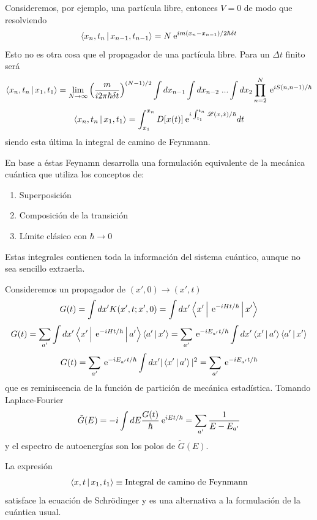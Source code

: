 \documentclass[10pt,oneside]{CBFT_book}
\begin{document}
Consideremos, por ejemplo, una partícula libre, entonces $V=0$ de modo que resolviendo 
\[
	\Braket{x_n,t_n|x_{n-1},t_{n-1}} = N \:\mathrm{e}^{im(x_n - x_{n-1})/2\hbar\delta t}
\]
Esto no es otra cosa que el propagador de una partícula libre. Para un $\Delta t$ finito será 
\[
	\Braket{x_n,t_n|x_1,t_1}  = \lim_{N\to\infty} \left(\frac{m}{i2\pi\hbar\delta t}\right)^{(N-1)/2}
	\int dx_{n-1}\int dx_{n-2} \; ... \int dx_2 \prod_{n=2}^N \:\mathrm{e}^{i S(n,n-1)/\hbar}
\]
\[
	\Braket{x_n,t_n|x_1,t_1}  = \int_{x_1}^{x_n} D[x(t)] \:\mathrm{e}^{i \int _{t_1}^{t_n} \mathscr{L}(x,\dot{x})/\hbar} dt
\]
siendo esta última la integral de camino de Feynmann.

En base a éstas Feynamn desarrolla una formulación equivalente de la mecánica cuántica que utiliza los 
conceptos de:
\begin{enumerate}
 \item Superposición
 \item Composición de la transición
 \item Límite clásico con $\hbar \to 0$
\end{enumerate}

Estas integrales contienen toda la información del sistema cuántico, aunque no sea sencillo extraerla.

Consideremos un propagador de $(x',0) \to (x',t)$
\[
	G(t) = \int dx' K(x',t ; x', 0) = \int dx' \Braket{x'|\:\mathrm{e}^{-i Ht/\hbar}|x'}
\]
\[
	G(t) = \sum_{a'} \int dx' \Braket{x'|\:\mathrm{e}^{-i Ht/\hbar}|a'}\Braket{a'|x'} =
		\sum_{a'} \:\mathrm{e}^{-i E_{a'}t/\hbar} \int dx' \Braket{x'|a'}\Braket{a'|x' }
\]
\[
	G(t) = \sum_{a'} \:\mathrm{e}^{-i E_{a'}t/\hbar} \int dx' |\Braket{x'|a'}|^2 = \sum_{a'} \:\mathrm{e}^{-i E_{a'}t/\hbar} 
\]
que es reminiscencia de la función de partición de mecánica estadística. Tomando Laplace-Fourier 
\[
	\tilde{G}(E) = -i \int dE \frac{G(t)}{\hbar} \:\mathrm{e}^{i E t/\hbar} = \sum_{a'} \frac{1}{E-E_{a'}}
\]
y el espectro de autoenergías son los polos de $\tilde{G}(E)$.

La expresión 
\[
	\Braket{x,t|x_1,t_1} \equiv \text{Integral de camino de Feynmann}
\]
satisface la ecuación de Schrödinger y es una alternativa a la formulación de la cuántica usual.


\end{document}
